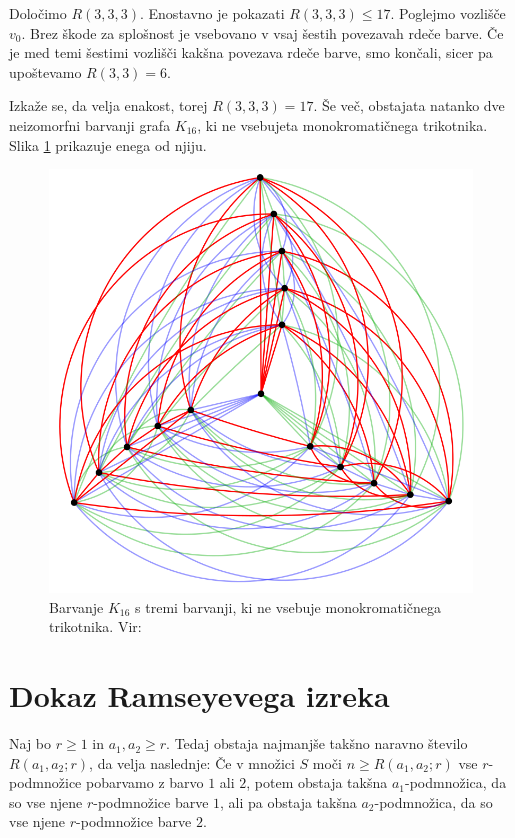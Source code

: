 \documentclass[twoside,11pt]{article}
\begin{document}
\begin{zgled}
    Določimo $R(3, 3, 3)$.
    Enostavno je pokazati $R(3,3,3) \le 17$. Poglejmo vozlišče $v_0$. Brez škode za splošnost je vsebovano v vsaj šestih povezavah rdeče 
    barve. Če je med temi šestimi vozlišči kakšna povezava rdeče barve, smo končali, 
    sicer pa upoštevamo $R(3, 3) = 6$.

    Izkaže se, da velja enakost, torej $R(3, 3, 3) = 17$. Še več, obstajata natanko dve 
    neizomorfni barvanji grafa $K_{16}$, ki ne vsebujeta monokromatičnega trikotnika.
    Slika \ref{fig:r333} prikazuje enega od njiju.
    \begin{figure}[h!]
        \centering
        \includegraphics[scale=0.3]{r333.png}
        \caption{Barvanje $K_{16}$ s tremi barvanji, ki ne vsebuje monokromatičnega trikotnika. Vir: \cite{r333}}
        \label{fig:r333}
    \end{figure}
\end{zgled}

\section{Dokaz Ramseyevega izreka}

\begin{izrek}[Ramsey]
    Naj bo $r \ge 1$ in $a_1, a_2 \ge r$. Tedaj obstaja najmanjše takšno naravno število 
    $R(a_1, a_2; r)$, da velja naslednje: Če v množici $S$ moči $n \ge R(a_1, a_2; r)$
    vse $r$-podmnožice pobarvamo z barvo $1$ ali $2$, potem obstaja takšna $a_1$-podmnožica, 
    da so vse njene $r$-podmnožice barve $1$, ali pa obstaja takšna $a_2$-podmnožica, da so 
    vse njene $r$-podmnožice barve $2$. \label{izrek:ramsey}
\end{izrek}
\end{document}
